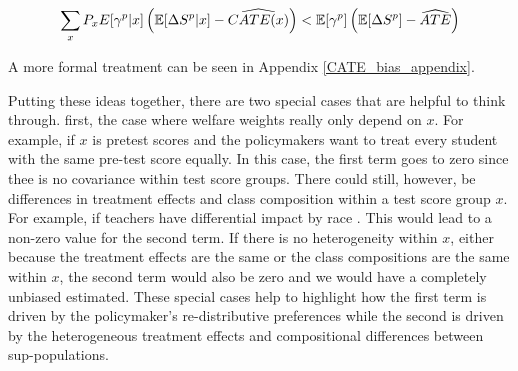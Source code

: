 \documentclass[12pt]{article}
\theoremstyle{definition}
\theoremstyle{definition}
\theoremstyle{definition}
\theoremstyle{definition}
\begin{document}
    \begin{equation}
        \sum_{x} P_x  E[\gamma^p|x] \left( \mathbb{E}[\Delta S^p|x]-\widehat{CATE(x)} \right) < \mathbb{E}[\gamma^p] \left (\mathbb{E}[\Delta S^p]-\widehat{ATE} \right )
    \end{equation}
    
    A more formal treatment can be seen in Appendix \ref{CATE_bias_appendix}.

    Putting these ideas together, there are two special cases that are helpful to think through. first, the case where welfare weights really only depend on $x$. For example, if $x$ is pretest scores and the policymakers want to treat every student with the same pre-test score equally. In this case, the first term goes to zero since thee is no covariance within test score groups. There could still, however, be differences in treatment effects and class composition within a test score group $x$. For example, if teachers have differential impact by race \citep{Delgado2020}. This would lead to a non-zero value for the second term. If there is no heterogeneity within $x$, either because the treatment effects are the same or the class compositions are the same within $x$, the second term would also be zero and we would have a completely unbiased estimated. These special cases help to highlight how the first term is driven by the policymaker's re-distributive preferences while the second is driven by the heterogeneous treatment effects and compositional differences between sup-populations. 


    
\end{document}
